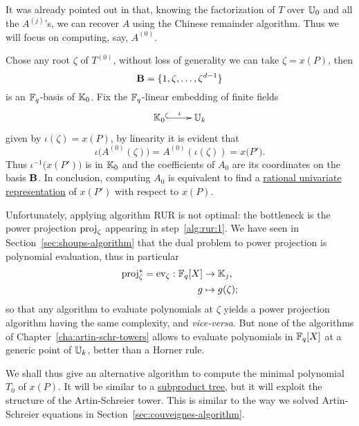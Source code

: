 It was already pointed out in \cite[$\S$2.3]{couveignes96} that,
knowing the factorization of $T$ over $\mathbb{U}_0$ and all the $A^{(j)}$'s,
we can recover $A$ using the Chinese remainder algorithm. Thus we will
focus on computing, say, $A^{(0)}$.

Chose any root $\zeta$ of $T^{(0)}$, without loss of generality we
can take $\zeta=x(P)$, then
\begin{equation}
  \label{eq:188}
  \mathbf{B}=\{1,\zeta,\ldots,\zeta^{d-1}\}  
\end{equation}
is an $\mathbb{F}_q$-basis of $\mathbb{K}_0$.  Fix the $\mathbb{F}_q$-linear embedding of
finite fields
\begin{equation}
  \label{eq:embed}
  \xymatrix{
    \K_0 \ar@{^{(}->}[r]^-\iota & \U_k
  }
\end{equation}
given by $\iota(\zeta) = x(P)$, by linearity it is evident that
\begin{equation}
  \iota\bigl(A^{(0)}(\zeta)\bigr) = A^{(0)}\left(\iota(\zeta)\right)=x\bigl(P'\bigr)
  \text{.}
\end{equation}
Thus $\iota^{-1}\bigl(x(P')\bigr)$ is in $\mathbb{K}_0$ and the coefficients
of $A_0$ are its coordinates on the basis $\mathbf{B}$. In conclusion,
computing $A_0$ is equivalent to find a \hyperref[eq:22]{rational
  univariate representation} of $x(P')$ with respect to $x(P)$.

Unfortunately, applying algorithm RUR is not optimal: the bottleneck
is the power projection $\operatorname{proj}_\zeta$ appearing in
step~\ref{alg:rur:1}. We have seen in
Section~\ref{sec:shoups-algorithm} that the dual problem to power
projection is polynomial evaluation, thus in particular
\begin{equation}
  \label{eq:189}
  \begin{aligned}
    \operatorname{proj}_\zeta^\ast = \operatorname{ev}_\zeta : \mathbb{F}_q[X] &\rightarrow \mathbb{K}_j\text{,}\\
    g &\mapsto g(\zeta)\text{;}
  \end{aligned}
\end{equation}
so that any algorithm to evaluate polynomials at $\zeta$ yields a
power projection algorithm having the same complexity, and
\emph{vice-versa}. But none of the algorithms of
Chapter~\ref{cha:artin-schr-towers} allows to evaluate polynomials in
$\mathbb{F}_q[X]$ at a generic point of $\mathbb{U}_k$, better than a Horner rule.

We shall thus give an alternative algorithm to compute the minimal
polynomial $T_0$ of $x(P)$. It will be similar to a
\hyperref[sec:chin-rema-algor]{subproduct tree}, but it will exploit
the structure of the Artin-Schreier tower. This is similar to the way
we solved Artin-Schreier equations in
Section~\ref{sec:couveignes-algorithm}.


